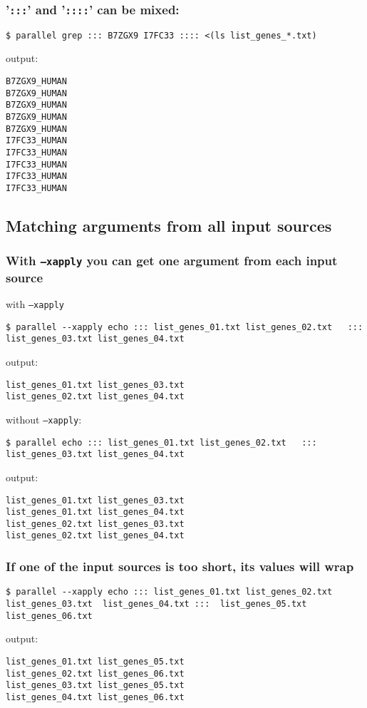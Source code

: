 \documentclass{article}
\begin{document}
\subsubsection{'\texttt{:::}' and '\texttt{::::}' can be mixed:}
\begin{lstlisting}
$ parallel grep ::: B7ZGX9 I7FC33 :::: <(ls list_genes_*.txt)
\end{lstlisting}
output:
\begin{lstlisting}
B7ZGX9_HUMAN
B7ZGX9_HUMAN
B7ZGX9_HUMAN
B7ZGX9_HUMAN
B7ZGX9_HUMAN
I7FC33_HUMAN
I7FC33_HUMAN
I7FC33_HUMAN
I7FC33_HUMAN
I7FC33_HUMAN
\end{lstlisting}

\subsection{Matching arguments from all input sources}
\subsubsection{With \texttt{--xapply} you can get one argument from each input source}

with \texttt{--xapply}
\begin{lstlisting}
$ parallel --xapply echo ::: list_genes_01.txt list_genes_02.txt   ::: list_genes_03.txt list_genes_04.txt
\end{lstlisting}
output:
\begin{lstlisting}
list_genes_01.txt list_genes_03.txt
list_genes_02.txt list_genes_04.txt
\end{lstlisting}

without \texttt{--xapply}:
\begin{lstlisting}
$ parallel echo ::: list_genes_01.txt list_genes_02.txt   ::: list_genes_03.txt list_genes_04.txt 
\end{lstlisting}
output:
\begin{lstlisting}
list_genes_01.txt list_genes_03.txt
list_genes_01.txt list_genes_04.txt
list_genes_02.txt list_genes_03.txt
list_genes_02.txt list_genes_04.txt
\end{lstlisting}

\subsubsection{If one of the input sources is too short, its values will wrap}
\begin{lstlisting}
$ parallel --xapply echo ::: list_genes_01.txt list_genes_02.txt list_genes_03.txt  list_genes_04.txt :::  list_genes_05.txt list_genes_06.txt
\end{lstlisting}
output:
\begin{lstlisting}
list_genes_01.txt list_genes_05.txt
list_genes_02.txt list_genes_06.txt
list_genes_03.txt list_genes_05.txt
list_genes_04.txt list_genes_06.txt
\end{lstlisting}
\end{document}
